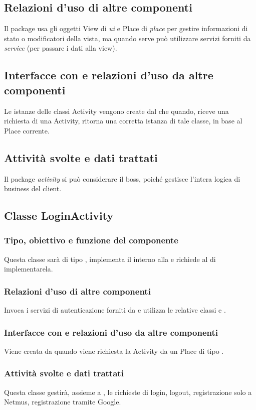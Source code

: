 \subsection*{Relazioni d'uso di altre componenti} Il package usa gli oggetti
View di \emph{ui} e Place di \emph{place} per gestire informazioni di stato o
modificatori della vista, ma quando serve pu\`o utilizzare servizi forniti da
\emph{service} (per passare i dati alla view).
\subsection*{Interfacce con e relazioni d'uso da altre componenti} Le istanze
delle classi Activity vengono create dal  che quando,
riceve una richiesta di una Activity, ritorna una corretta istanza di tale
classe, in base al Place corrente.
\subsection*{Attivit\`a svolte e dati trattati} Il package \emph{activity} si
pu\`o considerare il boss, poich\'e gestisce l'intera logica di business del
client.

\subsection{Classe LoginActivity}
\subsubsection*{Tipo, obiettivo e funzione del componente}
Questa classe sar\`a di tipo , implementa il 
interno alla  e richiede al  di implementarela.
 
\subsubsection*{Relazioni d'uso di altre componenti}
Invoca i servizi di autenticazione forniti da  e utilizza
le relative classi  e .
\subsubsection*{Interfacce con e relazioni d'uso da altre componenti} 
Viene creata da  quando viene richiesta la Activity da
un Place di tipo .
\subsubsection*{Attivit\`a svolte e dati trattati}
Questa classe gestir\`a, assieme a , le richieste di login,
logout, registrazione solo a Netmus, registrazione tramite Google.

